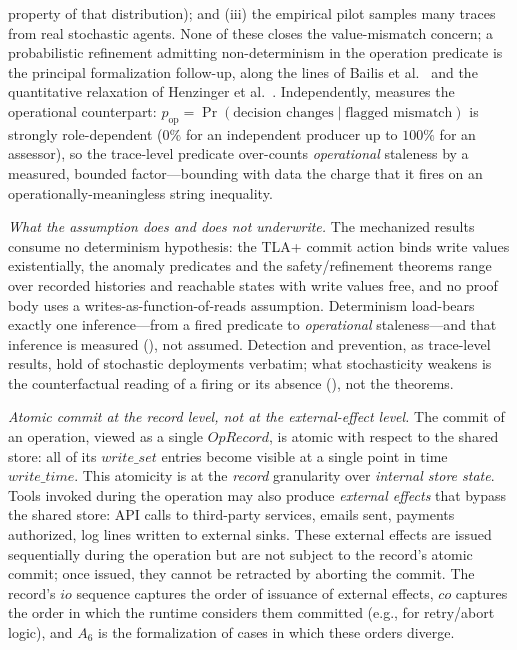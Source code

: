 \documentclass[journal,compsoc,10pt]{IEEEtran}
\theoremstyle{definition}
\theoremstyle{remark}
\newcommand{\fld}[1]{\mathit{#1}}
\begin{document}
property of that distribution); and (iii) the empirical pilot samples many
traces from real stochastic agents. None of these closes the
value-mismatch concern; a probabilistic refinement admitting
non-determinism in the operation predicate is the principal formalization
follow-up, along the lines of Bailis et al.~\cite{BailisEtAl2012PBS} and
the quantitative relaxation of Henzinger et
al.~\cite{HenzingerEtAl2013Quantitative}. Independently,
 measures the operational counterpart:
$p_{\text{op}}=\Pr(\text{decision changes}\mid\text{flagged mismatch})$ is
strongly role-dependent ($0\%$ for an independent producer up to $100\%$
for an assessor), so the trace-level predicate over-counts
\emph{operational} staleness by a measured, bounded factor---bounding with
data the charge that it fires on an operationally-meaningless string
inequality.

\emph{What the assumption does and does not underwrite.} The mechanized
results consume no determinism hypothesis: the TLA+ commit action binds
write values existentially, the anomaly predicates and the
safety/refinement theorems range over recorded histories and reachable
states with write values free, and no proof body uses a
writes-as-function-of-reads assumption. Determinism load-bears exactly one
inference---from a fired predicate to \emph{operational} staleness---and
that inference is measured (), not
assumed. Detection and prevention, as trace-level results, hold of
stochastic deployments verbatim; what stochasticity weakens is the
counterfactual reading of a firing or its absence
(), not the theorems.

\emph{Atomic commit at the record level, not at the external-effect level.}
The commit of an operation, viewed as a single $\fld{OpRecord}$,
is atomic with respect to the shared store: all of its
$\fld{write\_set}$ entries become visible at a single point in
time $\fld{write\_time}$. This atomicity is at the \emph{record}
granularity over \emph{internal store state}. Tools invoked
during the operation may also produce \emph{external effects}
that bypass the shared store: API calls to third-party services,
emails sent, payments authorized, log lines written to external
sinks. These external effects are issued sequentially during the
operation but are not subject to the record's atomic commit; once
issued, they cannot be retracted by aborting the commit. The
record's $\fld{io}$ sequence captures the order of issuance of
external effects, $\fld{co}$ captures the order in which the
runtime considers them committed (e.g., for retry/abort logic),
and $A_6$ is the formalization of cases in which these orders
diverge.
\end{document}
